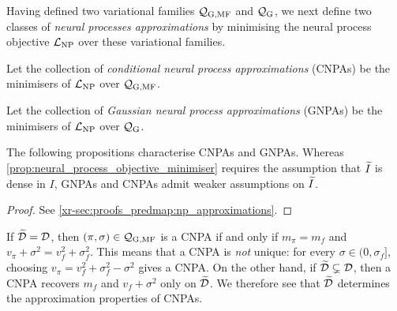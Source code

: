 \documentclass[12pt, twoside]{report}
\newcommand{\xrprefix}[1]{xr-#1}
\begin{document}
Having defined two variational families $\Qc\ss{G,MF}$ and $\Qc\ss{G}$, we next define two classes of \emph{neural processes approximations} by minimising the neural process objective $\L\ss{NP}$ over these variational families.

\begin{definition}
    \label{def:cnpa}
    Let the collection of \emph{conditional neural process approximations} (CNPAs)
    be the minimisers of $\L\ss{NP}$ over $\Qc\ss{G,MF}$.
\end{definition}

\begin{definition}
    \label{def:gnpa}
    Let the collection of \emph{Gaussian neural process approximations} (GNPAs)
    be the minimisers of $\L\ss{NP}$ over $\Qc\ss{G}$.
\end{definition}

The following propositions characterise CNPAs and GNPAs.
Whereas \cref{prop:neural_process_objective_minimiser} requires the assumption that $\widetilde{I}$ is dense in $I$, GNPAs and CNPAs admit weaker assumptions on $\widetilde{I}$.

\begin{proof}
    See \cref{\xrprefix{sec:proofs_predmap:np_approximations}}.
\end{proof}


If $\widetilde{\mathcal{D}} = \mathcal{D}$, then $(\pi, \sigma) \in \Qc\ss{G,MF}$ is a CNPA if and only if $m_{\pi} = m_f$ and $v_{\pi} + \sigma^2 = v_f^2 + \sigma_f^2$.
This means that a CNPA is \emph{not} unique:
for every $\sigma \in (0, \sigma_f]$, choosing $v_{\pi}= v_f^2 + \sigma_f^2 - \sigma^2$ gives a CNPA.
On the other hand, if $\widetilde{\mathcal{D}} \subsetneq \mathcal{D}$, then a CNPA recovers $m_f$ and $v_f + \sigma^2$ only on $\widetilde{\mathcal{D}}$.
We therefore see that $\widetilde{\mathcal{D}}$ determines the approximation properties of CNPAs.
\end{document}
